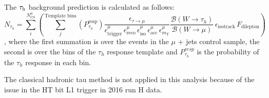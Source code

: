 The $\tau_\mathrm{h}$ background prediction is calculated as follows:
\begin{equation}
N_{\tau_{h}} = \sum\limits_i^{N_\mathrm{CS}^\mu}\left(\sum\limits_j^\text{Template bins}(P_{\tau_h}^\text{resp})
\frac{\epsilon_{\tau \rightarrow \mu}}{\epsilon^{\mu}_\text{trigger}\,\epsilon^{\mu}_\text{reco}\,\epsilon^{\mu}_\text{iso}\,\epsilon^{\mu}_\text{acc}\,\epsilon^{\mu}_{m_\text{T}}} \dfrac{ \mathcal{B}(W \rightarrow \tau_h)}{\mathcal{B}(W \rightarrow \mu)}\,\epsilon_\text{isotrack}\,F_\text{dilepton}\right)
\label{eq:tauh}
\end{equation}
, where the first summation is over the events in the $\mu$ + jets control sample, the second is over the bins of the $\tau_h$ response template and $P_{\tau_h}^{resp}$ is the probability of the $\tau_h$ response in each bin.

The classical hadronic tau method is not applied in this analysis because of the issue in the HT bit L1 trigger in 2016 run H data.
